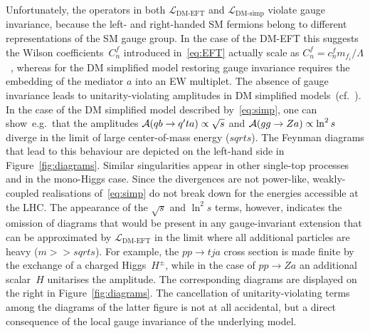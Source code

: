 \documentclass[a4paper, 11pt,notoc]{article}
\begin{document}
Unfortunately, the operators in both $\mathcal{L}_\text{DM-EFT}$ and $\mathcal{L}_\text{DM-simp}$ violate gauge invariance, because the left- and right-handed SM fermions belong to different representations of the SM gauge group. In the case of the DM-EFT this suggests the Wilson coefficients~$C_n^f$ introduced in~\eqref{eq:EFT} actually scale as $C_n^f = c_n^f m_{f_i}/\Lambda$~\cite{Bell:2015sza}, whereas for the DM simplified model restoring gauge invariance requires the embedding of the mediator $a$ into an EW multiplet. The absence of gauge invariance leads to unitarity-violating amplitudes in DM simplified models~(cf.~\cite{Bell:2015sza,Bell:2015rdw,Haisch:2016usn,Englert:2016joy,Maltoni:2001hu,Farina:2012xp}). In the case of the DM simplified model described by~\eqref{eq:simp}, one can show~e.g.~that the amplitudes ${\cal A} ( q b \to q^\prime t a) \propto \sqrt{s}$ and ${\cal A} ( g g \to Z a ) \propto \ln^2 s$ diverge in the limit of large center-of-mass energy ($sqrt{s}$). The Feynman diagrams that lead to this behaviour are depicted on the left-hand side in Figure~\ref{fig:diagrams}. Similar singularities appear in other single-top processes and in the mono-Higgs case.  Since the divergences are not power-like, weakly-coupled realisations of~\eqref{eq:simp} do not break down for the energies accessible at the LHC. The appearance of the $\sqrt{s}$ and $\ln^2 s$ terms, however, indicates the omission of diagrams that would be present in any gauge-invariant extension that can be approximated by $\mathcal{L}_\text{DM-EFT}$ in the limit where all additional particles are heavy ($m >> sqrt{s}$).   For example, the $pp \to tj a$ cross section is made finite by the exchange of a charged Higgs~$H^\pm$, while in the case of $pp \to Za$  an additional scalar~$H$ unitarises the amplitude. The corresponding diagrams are displayed on the right in Figure~\ref{fig:diagrams}. The cancellation of unitarity-violating terms among the diagrams of the latter figure is not at all accidental, but a direct consequence of the local gauge invariance of the underlying model.
\end{document}
